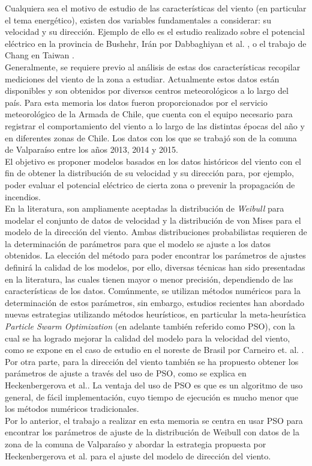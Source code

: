 Cualquiera sea el motivo de estudio de las características del viento (en particular el tema energético), existen dos variables fundamentales a considerar: su velocidad y su dirección. Ejemplo de ello es el estudio realizado sobre el potencial eléctrico en la provincia de Bushehr, Irán por Dabbaghiyan et al. \cite{Dabbaghiyan15}, o el trabajo de Chang en Taiwan \cite{Chang10_2}.\\ 
Generalmente, se requiere previo al análisis de estas dos características recopilar mediciones del viento de la zona a estudiar.
Actualmente estos datos están disponibles y son obtenidos por diversos centros meteorológicos a lo largo del país. Para esta memoria los datos fueron proporcionados por el servicio meteorológico de la Armada de Chile, que cuenta con el equipo necesario para registrar el comportamiento del viento a lo largo de las distintas épocas del año y en diferentes zonas de Chile. Los datos con los que se trabajó son de la comuna de Valparaíso entre los años 2013, 2014 y 2015.\\
El objetivo es proponer modelos basados en los datos históricos del viento con el fin de obtener la distribución de su velocidad y su dirección para, por ejemplo, poder evaluar el potencial eléctrico de cierta zona o prevenir la propagación de incendios. \\ 
En la literatura, son ampliamente aceptadas la distribución de \emph{Weibull} para modelar el conjunto de datos de velocidad y la distribución de von Mises para el modelo de la dirección del viento. Ambas distribuciones probabilistas requieren de la determinación de parámetros para que el modelo se ajuste a los datos obtenidos. La elección del método para poder encontrar los parámetros de ajustes definirá la calidad de los modelos, por ello, diversas técnicas han sido presentadas en la literatura, las cuales tienen mayor o menor precisión, dependiendo de las características de los datos. Comúnmente, se utilizan métodos numéricos para la determinación de estos parámetros, sin embargo, estudios recientes han abordado nuevas estrategias
utilizando métodos heurísticos, en particular la meta-heurística \emph{Particle Swarm Optimization} (en adelante también referido como PSO), con la cual se ha logrado mejorar la calidad del modelo para la velocidad del viento, como se expone en el caso de estudio en el noreste de Brasil por Carneiro et. al.  \cite{Carneiro15}. Por otra parte, para la dirección del viento también se ha propuesto obtener los parámetros de ajuste a través del uso de PSO, como se explica en Heckenbergerova et al.\cite{Heckenbergerova15}. La ventaja del uso de PSO es que es un algoritmo de uso general, de fácil implementación, cuyo tiempo de ejecución es mucho menor que los métodos numéricos tradicionales.\\
Por lo anterior, el trabajo a realizar en esta memoria se centra en usar PSO para encontrar los parámetros de ajuste de la distribución de Weibull con datos de la zona de la comuna de Valparaíso y abordar la estrategia propuesta por Heckenbergerova et al.\cite{Heckenbergerova15} para el ajuste del modelo de dirección del viento.


